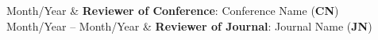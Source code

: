 \begin{resumeSubContent}
{Month/Year} & {\textbf{Reviewer of Conference}: Conference Name (\textbf{CN})}\\
{Month/Year -- Month/Year} & {\textbf{Reviewer of Journal}: Journal Name (\textbf{JN})}
\end{resumeSubContent}